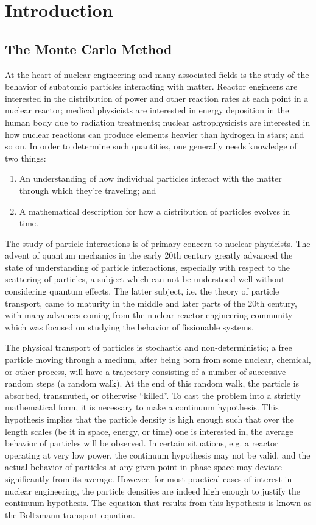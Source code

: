 \chapter{Introduction}
\label{chap:intro}

\section{The Monte Carlo Method}

At the heart of nuclear engineering and many associated fields is the study of
the behavior of subatomic particles interacting with matter. Reactor engineers
are interested in the distribution of power and other reaction rates at each
point in a nuclear reactor; medical physicists are interested in energy
deposition in the human body due to radiation treatments; nuclear
astrophysicists are interested in how nuclear reactions can produce elements
heavier than hydrogen in stars; and so on. In order to determine such
quantities, one generally needs knowledge of two things:
\begin{enumerate}
\item An understanding of how individual particles interact with the matter
  through which they're traveling; and
\item A mathematical description for how a distribution of particles evolves in
  time.
\end{enumerate}
The study of particle interactions is of primary concern to nuclear
physicists. The advent of quantum mechanics in the early 20th century greatly
advanced the state of understanding of particle interactions, especially with
respect to the scattering of particles, a subject which can not be understood
well without considering quantum effects. The latter subject, i.e. the theory of
particle transport, came to maturity in the middle and later parts of the 20th
century, with many advances coming from the nuclear reactor engineering
community which was focused on studying the behavior of fissionable systems.

The physical transport of particles is stochastic and non-deterministic; a free
particle moving through a medium, after being born from some nuclear, chemical,
or other process, will have a trajectory consisting of a number of successive
random steps (a random walk). At the end of this random walk, the particle is
absorbed, transmuted, or otherwise ``killed''.  To cast the problem into a
strictly mathematical form, it is necessary to make a continuum hypothesis. This
hypothesis implies that the particle density is high enough such that over the
length scales (be it in space, energy, or time) one is interested in, the
average behavior of particles will be observed. In certain situations, e.g. a
reactor operating at very low power, the continuum hypothesis may not be valid,
and the actual behavior of particles at any given point in phase space may
deviate significantly from its average. However, for most practical cases of
interest in nuclear engineering, the particle densities are indeed high enough
to justify the continuum hypothesis. The equation that results from this
hypothesis is known as the Boltzmann transport equation.

